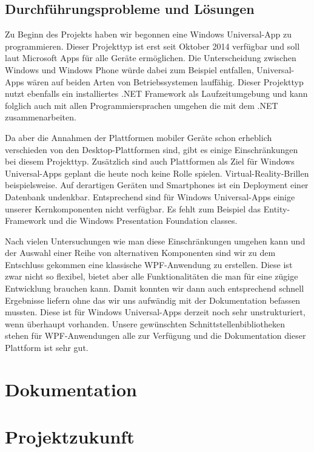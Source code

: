\documentclass[12pt]{article}
\begin{document}
\subsection{Durchführungsprobleme und Lösungen}

Zu Beginn des Projekts haben wir begonnen eine Windows Universal-App zu programmieren. Dieser Projekttyp ist erst seit Oktober 2014 verfügbar und soll laut Microsoft Apps für alle Geräte ermöglichen. Die Unterscheidung zwischen Windows und Windows Phone würde dabei zum Beispiel entfallen, Universal-Apps wären auf beiden Arten von Betriebssystemen lauffähig. Dieser Projekttyp nutzt ebenfalls ein installiertes .NET Framework als Laufzeitumgebung und kann folglich auch mit allen Programmiersprachen umgehen die mit dem .NET zusammenarbeiten.
\newline

Da aber die Annahmen der Plattformen mobiler Geräte schon erheblich verschieden von den Desktop-Plattformen sind, gibt es einige Einschränkungen bei diesem Projekttyp. Zusätzlich sind auch Plattformen als Ziel für Windows Universal-Apps geplant die heute noch keine Rolle spielen. Virtual-Reality-Brillen beispielsweise. Auf derartigen Geräten und Smartphones ist ein Deployment einer Datenbank undenkbar. Entsprechend sind für Windows Universal-Apps einige unserer Kernkomponenten nicht verfügbar. Es fehlt zum Beispiel das Entity-Framework und die Windows Presentation Foundation classes.
\newline

Nach vielen Untersuchungen wie man diese Einschränkungen umgehen kann und der Auswahl einer Reihe von alternativen Komponenten sind wir zu dem Entschluss gekommen eine klassische WPF-Anwendung zu erstellen. Diese ist zwar nicht so flexibel, bietet aber alle Funktionalitäten die man für eine zügige Entwicklung brauchen kann. Damit konnten wir dann auch entsprechend schnell Ergebnisse liefern ohne das wir uns aufwändig mit der Dokumentation befassen mussten. Diese ist für Windows Universal-Apps derzeit noch sehr unstrukturiert, wenn überhaupt vorhanden. Unsere gewünschten Schnittstellenbibliotheken stehen für WPF-Anwendungen alle zur Verfügung und die Dokumentation dieser Plattform ist sehr gut.

\newpage
\section{Dokumentation}

\newpage
\section{Projektzukunft}
\end{document}
